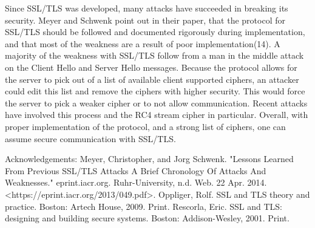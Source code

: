 Since SSL/TLS was developed, many attacks have succeeded in breaking its
security.  Meyer and Schwenk point out in their paper, that the protocol for
SSL/TLS should be followed and documented rigorously during implementation, and
that most of the weakness are a result of poor implementation(14).  A majority
of the weakness with SSL/TLS follow from a man in the middle attack on the
Client Hello and Server Hello messages.  Because the protocol allows for the
server to pick out of a list of available client supported ciphers, an attacker
could edit this list and remove the ciphers with higher security.  This would
force the server to pick a weaker cipher or to not allow communication.  Recent
attacks have involved this process and the RC4 stream cipher in particular.
Overall, with proper implementation of the protocol, and a strong list of
ciphers,  one can assume secure communication with SSL/TLS.

Acknowledgements:
Meyer, Christopher, and Jorg Schwenk. "Lessons Learned From Previous SSL/TLS Attacks A Brief Chronology Of Attacks And Weaknesses." eprint.iacr.org. Ruhr-University, n.d. Web. 22 Apr. 2014. <https://eprint.iacr.org/2013/049.pdf>.
Oppliger, Rolf. SSL and TLS theory and practice. Boston: Artech House, 2009. Print.
Rescorla, Eric. SSL and TLS: designing and building secure systems. Boston: Addison-Wesley, 2001. Print.
